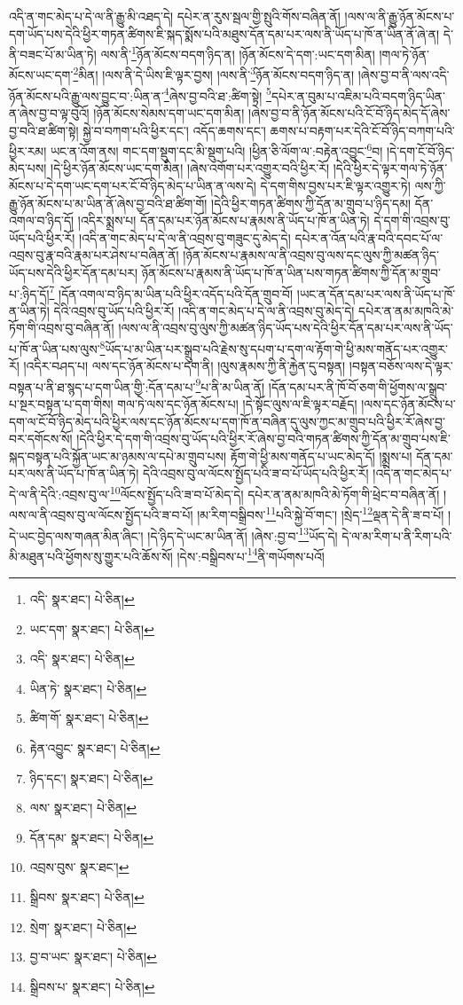 འདི་ན་གང་མེད་པ་དེ་ལ་ནི་རྒྱུ་མི་འཐད་དེ། དཔེར་ན་རུས་སྦལ་གྱི་སྤུའི་གོས་བཞིན་ནོ། །ལས་ལ་ནི་རྒྱུ་ཉོན་མོངས་པ་དག་ཡོད་པས་དེའི་ཕྱིར་གཏན་ཚིགས་ཇི་སྐད་སྨོས་པའི་མཐུས་དོན་དམ་པར་ལས་ནི་ཡོད་པ་ཁོ་ན་ཡིན་ནོ་ཞེ་ན། དེ་ནི་བཟང་པོ་མ་ཡིན་ཏེ། ལས་ནི་\footnote{འདི་  སྣར་ཐང་།  པེ་ཅིན། }ཉོན་མོངས་བདག་ཉིད་ན། །ཉོན་མོངས་དེ་དག་:ཡང་དག་མིན། །གལ་ཏེ་ཉོན་མོངས་ཡང་དག་\footnote{ཡང་དག་  སྣར་ཐང་།  པེ་ཅིན། }མིན། །ལས་ནི་དེ་ཡིས་ཇི་ལྟར་བྱས། །ལས་ནི་\footnote{འདི་  སྣར་ཐང་།  པེ་ཅིན། }ཉོན་མོངས་བདག་ཉིད་ན། །ཞེས་བྱ་བ་ནི་ལས་འདི་ཉོན་མོངས་པའི་རྒྱུ་ལས་བྱུང་བ་:ཡིན་ན་\footnote{ཡིན་ཏེ་  སྣར་ཐང་།  པེ་ཅིན། }ཞེས་བྱ་བའི་ཐ་:ཚིག་སྟེ། \footnote{ཚིག་གོ་  སྣར་ཐང་།  པེ་ཅིན། }དཔེར་ན་བུམ་པ་འཇིམ་པའི་བདག་ཉིད་ཡིན་ན་ཞེས་བྱ་བ་ལྟ་བུའོ། །ཉོན་མོངས་སེམས་དག་ཡང་དག་མིན། །ཞེས་བྱ་བ་ནི་ཉོན་མོངས་པའི་ངོ་བོ་ཉིད་མེད་དོ་ཞེས་བྱ་བའི་ཐ་ཚིག་སྟེ། སྐྱེ་བ་བཀག་པའི་ཕྱིར་དང་། འདོད་ཆགས་དང་། ཆགས་པ་བརྟག་པར་དེའི་ངོ་བོ་ཉིད་བཀག་པའི་ཕྱིར་རམ། ཡང་ན་འོག་ནས། གང་དག་སྡུག་དང་མི་སྡུག་པའི། །ཕྱིན་ཅི་ལོག་ལ་:བརྟེན་འབྱུང་\footnote{རྟེན་འབྱུང་  སྣར་ཐང་།  པེ་ཅིན། }བ། །དེ་དག་ངོ་བོ་ཉིད་མེད་པས། །དེ་ཕྱིར་ཉོན་མོངས་ཡང་དག་མིན། །ཞེས་འགོག་པར་འགྱུར་བའི་ཕྱིར་རོ། །དེའི་ཕྱིར་དེ་ལྟར་གལ་ཏེ་ཉོན་མོངས་པ་དེ་དག་ཡང་དག་པར་ངོ་བོ་ཉིད་མེད་པ་ཡིན་ན་ལས་དེ། དེ་དག་གིས་བྱས་པར་ཇི་ལྟར་འགྱུར་ཏེ། ལས་ཀྱི་རྒྱུ་ཉོན་མོངས་པ་མ་ཡིན་ནོ་ཞེས་བྱ་བའི་ཐ་ཚིག་གོ། །དེའི་ཕྱིར་གཏན་ཚིགས་ཀྱི་དོན་མ་གྲུབ་པ་ཉིད་དམ། དོན་འགལ་བ་ཉིད་དོ། །འདིར་སྨྲས་པ། དོན་དམ་པར་ཉོན་མོངས་པ་རྣམས་ནི་ཡོད་པ་ཁོ་ན་ཡིན་ཏེ། དེ་དག་གི་འབྲས་བུ་ཡོད་པའི་ཕྱིར་རོ། །འདི་ན་གང་མེད་པ་དེ་ལ་ནི་འབྲས་བུ་གཟུང་དུ་མེད་དེ། དཔེར་ན་འོན་པའི་རྣ་བའི་དབང་པོ་ལ་འབྲས་བུ་རྣ་བའི་རྣམ་པར་ཤེས་པ་བཞིན་ནོ། །ཉོན་མོངས་པ་རྣམས་ལ་ནི་འབྲས་བུ་ལས་དང་ལུས་ཀྱི་མཚན་ཉིད་ཡོད་པས་དེའི་ཕྱིར་དོན་དམ་པར། ཉོན་མོངས་པ་རྣམས་ནི་ཡོད་པ་ཁོ་ན་ཡིན་པས་གཏན་ཚིགས་ཀྱི་དོན་མ་གྲུབ་པ་:ཉིད་དོ།\footnote{ཉིད་དང་།  སྣར་ཐང་།  པེ་ཅིན། } །དོན་འགལ་བ་ཉིད་མ་ཡིན་པའི་ཕྱིར་འདོད་པའི་དོན་གྲུབ་བོ། །ཡང་ན་དོན་དམ་པར་ལས་ནི་ཡོད་པ་ཁོ་ན་ཡིན་ཏེ། དེའི་འབྲས་བུ་ཡོད་པའི་ཕྱིར་རོ། །འདི་ན་གང་མེད་པ་དེ་ལ་ནི་འབྲས་བུ་མེད་དེ། དཔེར་ན་ནམ་མཁའི་མེ་ཏོག་གི་འབྲས་བུ་བཞིན་ནོ། །ལས་ལ་ནི་འབྲས་བུ་ལུས་ཀྱི་མཚན་ཉིད་ཡོད་པས་དེའི་ཕྱིར་དོན་དམ་པར་ལས་ནི་ཡོད་པ་ཁོ་ན་ཡིན་པས་ལུས་\footnote{ལས་  སྣར་ཐང་།  པེ་ཅིན། }ཡོད་པ་མ་ཡིན་པར་སྒྲུབ་པའི་རྗེས་སུ་དཔག་པ་དག་ལ་རྟོག་གེ་ཕྱི་མས་གནོད་པར་འགྱུར་རོ། །འདིར་བཤད་པ། ལས་དང་ཉོན་མོངས་པ་དག་ནི། །ལུས་རྣམས་ཀྱི་ནི་རྐྱེན་དུ་བསྟན། །བསྟན་བཅོས་ལས་དེ་ལྟར་བསྟན་པ་ནི་ཐ་སྙད་པ་དག་ཡིན་གྱི་:དོན་དམ་པ་\footnote{དོན་དམ་  སྣར་ཐང་།  པེ་ཅིན། }པ་ནི་མ་ཡིན་ནོ། །དོན་དམ་པར་ནི་ཁོ་བོ་ཅག་གི་ཕྱོགས་ལ་སྒྲུབ་པ་སྔར་བསྟན་པ་དག་གིས། གལ་ཏེ་ལས་དང་ཉོན་མོངས་པ། །དེ་སྟོང་ལུས་ལ་ཇི་ལྟར་བརྗོད། །ལས་དང་ཉོན་མོངས་པ་དག་ལ་ངོ་བོ་ཉིད་མེད་པའི་ཕྱིར་ལས་དང་ཉོན་མོངས་པ་དག་ཁོ་ན་བཞིན་དུ་ལུས་ཀྱང་མ་གྲུབ་པའི་ཕྱིར་རོ་ཞེས་བྱ་བར་དགོངས་སོ། །དེའི་ཕྱིར་དེ་དག་གི་འབྲས་བུ་ཡོད་པའི་ཕྱིར་རོ་ཞེས་བྱ་བའི་གཏན་ཚིགས་ཀྱི་དོན་མ་གྲུབ་པས་ཇི་སྐད་བསྟན་པའི་སྐྱོན་ཡང་མ་ཉམས་ལ་དཔེ་མ་གྲུབ་པས། རྟོག་གེ་ཕྱི་མས་གནོད་པ་ཡང་མེད་དོ། །སྨྲས་པ། དོན་དམ་པར་ལས་ནི་ཡོད་པ་ཁོ་ན་ཡིན་ཏེ། དེའི་འབྲས་བུ་ལ་ལོངས་སྤྱོད་པའི་ཟ་བ་པོ་ཡོད་པའི་ཕྱིར་རོ། །འདི་ན་གང་མེད་པ་དེ་ལ་ནི་དེའི་:འབྲས་བུ་ལ་\footnote{འབྲས་བུས་  སྣར་ཐང་། }ལོངས་སྤྱོད་པའི་ཟ་བ་པོ་མེད་དེ། དཔེར་ན་ནམ་མཁའི་མེ་ཏོག་གི་ཕྲེང་བ་བཞིན་ནོ། །ལས་ལ་ནི་འབྲས་བུ་ལ་ལོངས་སྤྱོད་པའི་ཟ་བ་པོ། །མ་རིག་བསྒྲིབས་\footnote{སྒྲིབས་  སྣར་ཐང་།  པེ་ཅིན། }པའི་སྐྱེ་བོ་གང་། །སྲེད་\footnote{སྲེག་  སྣར་ཐང་།  པེ་ཅིན། }ལྡན་དེ་ནི་ཟ་བ་པོ། །དེ་ཡང་བྱེད་ལས་གཞན་མིན་ཞིང་། །དེ་ཉིད་དེ་ཡང་མ་ཡིན་ནོ། །ཞེས་:བྱ་བ་\footnote{བྱ་བ་ཡང་  སྣར་ཐང་།  པེ་ཅིན། }ཡོད་དེ། དེ་ལ་མ་རིག་པ་ནི་རིག་པའི་མི་མཐུན་པའི་ཕྱོགས་སུ་གྱུར་པའི་ཆོས་སོ། །དེས་:བསྒྲིབས་པ་\footnote{སྒྲིབས་པ་  སྣར་ཐང་།  པེ་ཅིན། }ནི་གཡོགས་པའོ། 
